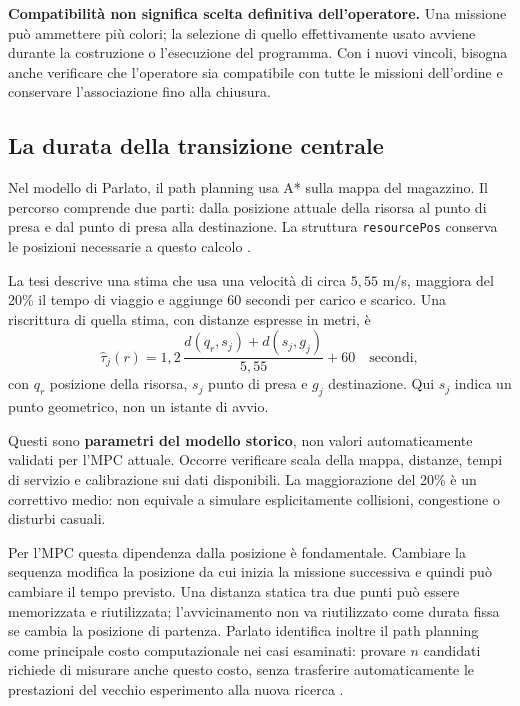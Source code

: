 \textbf{Compatibilità non significa scelta definitiva dell'operatore.} Una missione può ammettere più colori; la selezione di quello effettivamente usato avviene durante la costruzione o l'esecuzione del programma. Con i nuovi vincoli, bisogna anche verificare che l'operatore sia compatibile con tutte le missioni dell'ordine e conservare l'associazione fino alla chiusura.

\subsection{La durata della transizione centrale}

Nel modello di Parlato, il path planning usa A* sulla mappa del magazzino. Il percorso comprende due parti: dalla posizione attuale della risorsa al punto di presa e dal punto di presa alla destinazione. La struttura \texttt{resourcePos} conserva le posizioni necessarie a questo calcolo \cite[sezione 2.4.1, pp. 24--30]{Parlato}.

La tesi descrive una stima che usa una velocità di circa $5{,}55$ m/s, maggiora del 20\% il tempo di viaggio e aggiunge 60 secondi per carico e scarico. Una riscrittura di quella stima, con distanze espresse in metri, è
\begin{equation}
    \widehat\tau_j(r)
    =1{,}2\,\frac{d(q_r,s_j)+d(s_j,g_j)}{5{,}55}
      +60\quad\text{secondi},
\end{equation}
con $q_r$ posizione della risorsa, $s_j$ punto di presa e $g_j$ destinazione. Qui $s_j$ indica un punto geometrico, non un istante di avvio.

Questi sono \textbf{parametri del modello storico}, non valori automaticamente validati per l'MPC attuale. Occorre verificare scala della mappa, distanze, tempi di servizio e calibrazione sui dati disponibili. La maggiorazione del 20\% è un correttivo medio: non equivale a simulare esplicitamente collisioni, congestione o disturbi casuali.

Per l'MPC questa dipendenza dalla posizione è fondamentale. Cambiare la sequenza modifica la posizione da cui inizia la missione successiva e quindi può cambiare il tempo previsto. Una distanza statica tra due punti può essere memorizzata e riutilizzata; l'avvicinamento non va riutilizzato come durata fissa se cambia la posizione di partenza. Parlato identifica inoltre il path planning come principale costo computazionale nei casi esaminati: provare $n$ candidati richiede di misurare anche questo costo, senza trasferire automaticamente le prestazioni del vecchio esperimento alla nuova ricerca \cite[sezioni 2.4.1 e 3.6]{Parlato}.

